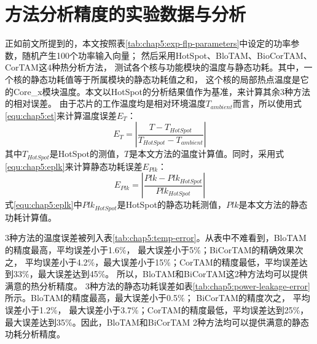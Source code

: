 \section{方法分析精度的实验数据与分析}
正如前文所提到的，本文按照表\ref{tab:chap5:exp-flp-parameters}中设定的功率参数，随机产生100个功率输入向量； 然后采用HotSpot、BloTAM、BioCorTAM、CorTAM这4种热分析方法， 测试各个核与功能模块的温度与静态功耗。其中，一个核的静态功耗值等于所属模块的静态功耗值之和， 这个核的局部热点温度是它的Core\_x模块温度。本文以HotSpot的分析结果值作为基准，来计算其余3种方法的相对误差。 由于芯片的工作温度均是相对环境温度$T_{ambient}$而言，所以使用式\ref{equ:chap5:et}来计算温度误差$E_T$：
\begin{equation}
\label{equ:chap5:et}
E_T = |\frac{T-T_{HotSpot}}{T_{HotSpot}-T_{ambient}}|
\end{equation}
其中$T_{HotSpot}$是HotSpot的测值，$T$是本文方法的温度计算值。同时，采用式\ref{equ:chap5:eplk}来计算静态功耗误差$E_{Plk}$：
\begin{equation}
\label{equ:chap5:eplk}
E_{Plk} = |\frac{Plk-Plk_{HotSpot}}{Plk_{HotSpot}}|
\end{equation}
式\ref{equ:chap5:eplk}中$Plk_{HotSpot}$是HotSpot的静态功耗测值，$Plk$是本文方法的静态功耗计算值。

3种方法的温度误差被列入表\ref{tab:chap5:temp-error}。从表中不难看到，BloTAM的精度最高，平均误差小于1.6\%， 最大误差小于5\%；BiCorTAM的精确效果次之， 平均误差小于4.2\%，最大误差小于15\%；CorTAM的精度最低，平均误差达到33\%，最大误差达到45\%。 所以，BloTAM和BiCorTAM这2种方法均可以提供满意的热分析精度。
3种方法的静态功耗误差如表\ref{tab:chap5:power-leakage-error}所示。BloTAM的精度最高，最大误差小于0.5\%； BiCorTAM的精度次之， 平均误差小于1.2\%， 最大误差小于3.7\%；CorTAM的精度最低，平均误差达到25\%，最大误差达到35\%。因此，BloTAM和BiCorTAM 2种方法均可以提供满意的静态功耗分析精度。

